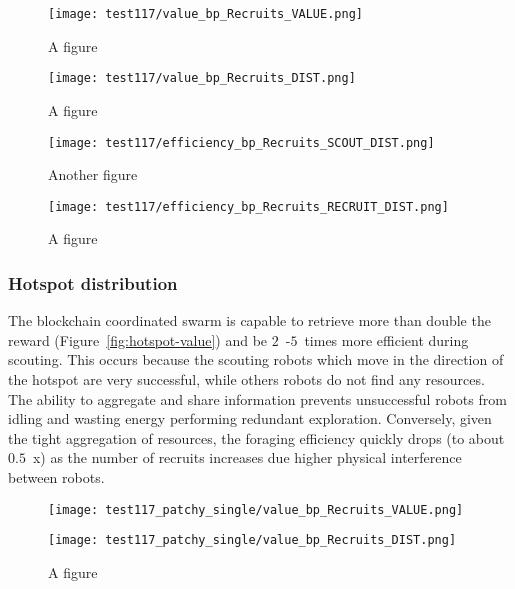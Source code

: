 \documentclass[runningheads]{llncs}
\begin{document}
\begin{figure}
\centering
\begin{minipage}{.495\textwidth}
  \centering
  \texttt{[image: test117/value\_bp\_Recruits\_VALUE.png]}
  \caption{A figure}
  \label{fig:abundant-value}
\end{minipage}
\begin{minipage}{.495\textwidth}
  \centering
  \texttt{[image: test117/value\_bp\_Recruits\_DIST.png]}
  \caption{A figure}
  \label{fig:abundant-dist}
\end{minipage}
\end{figure}

\begin{figure}
\centering
\begin{minipage}{.495\textwidth}
  \centering
  \texttt{[image: test117/efficiency\_bp\_Recruits\_SCOUT\_DIST.png]}
  \caption{Another figure}
  \label{fig:fig:abundant-eff-exp}
\end{minipage}
\begin{minipage}{.495\textwidth}
  \centering
  \texttt{[image: test117/efficiency\_bp\_Recruits\_RECRUIT\_DIST.png]}
  \caption{A figure}
  \label{fig:abundant-eff-for}
\end{minipage}
\end{figure}

\subsubsection{Hotspot distribution}

The blockchain coordinated swarm is capable to retrieve more than double the reward (Figure~\ref{fig:hotspot-value}) and be $2$~-$5$~times more efficient during scouting. This occurs because the scouting robots which move in the direction of the hotspot are very successful, while others robots do not find any resources. The ability to aggregate and share information prevents unsuccessful robots from idling and wasting energy performing redundant exploration. Conversely, given the tight aggregation of resources, the foraging efficiency quickly drops (to about $0.5$~x) as the number of recruits increases due higher physical interference between robots.

\begin{figure}
\centering
\begin{minipage}{.495\textwidth}
  \centering
  \texttt{[image: test117\_patchy\_single/value\_bp\_Recruits\_VALUE.png]}
  \caption{}
  \label{fig:hotspot-value}
\end{minipage}
\begin{minipage}{.495\textwidth}
  \centering
  \texttt{[image: test117\_patchy\_single/value\_bp\_Recruits\_DIST.png]}
  \caption{A figure}
  \label{fig:hotspot-dist}
\end{minipage}
\end{figure}
\end{document}
